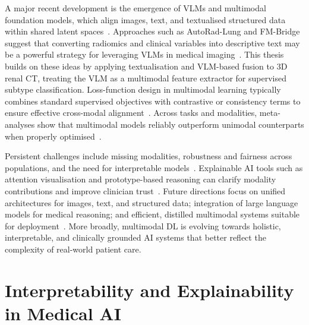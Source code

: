 \documentclass[final,british,a4paper,12pt]{phdthesis}
\begin{document}
A major recent development is the emergence of VLMs and multimodal foundation models, which align images, text, and textualised structured data within shared latent spaces~\cite{ryu2025vlmreview,radford2021learning,boecking2022biovil,huang2021gloria,park2020contrastive,zhang2023biomedclip}. Approaches such as AutoRad-Lung and FM-Bridge suggest that converting radiomics and clinical variables into descriptive text may be a powerful strategy for leveraging VLMs in medical imaging~\cite{khademi2025autorad,huang2025fmbridge}. This thesis builds on these ideas by applying textualisation and VLM-based fusion to 3D renal CT, treating the VLM as a multimodal feature extractor for supervised subtype classification. Loss-function design in multimodal learning typically combines standard supervised objectives with contrastive or consistency terms to ensure effective cross-modal alignment~\cite{windsor2023vision,huang2021gloria,haq2025mmml}. Across tasks and modalities, meta-analyses show that multimodal models reliably outperform unimodal counterparts when properly optimised~\cite{kline2022multimodal,haq2025mmml,simon2025multimodal,huang2020fusion,mohsen2022artificial}.

Persistent challenges include missing modalities, robustness and fairness across populations, and the need for interpretable models~\cite{kline2022multimodal,YANG202229,haq2025mmml}. Explainable AI tools such as attention visualisation and prototype-based reasoning can clarify modality contributions and improve clinician trust~\cite{YANG202229,diao2025ppal}. Future directions focus on unified architectures for images, text, and structured data; integration of large language models for medical reasoning; and efficient, distilled multimodal systems suitable for deployment~\cite{zambrano2025smallmm,Vanguri2022,zhoudeep}. More broadly, multimodal DL is evolving towards holistic, interpretable, and clinically grounded AI systems that better reflect the complexity of real-world patient care.

\section{Interpretability and Explainability in Medical AI}
\end{document}
